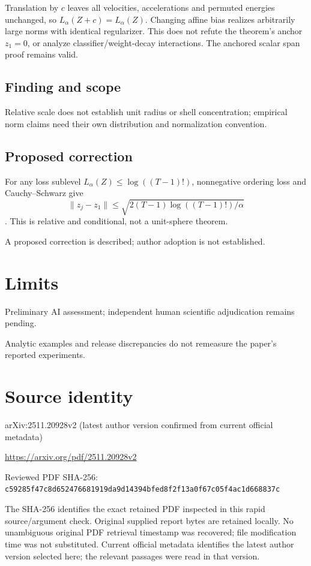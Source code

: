 \documentclass[11pt]{article}
\begin{document}
Translation by \(c\) leaves all velocities, accelerations and permuted energies unchanged, so \(L_\alpha(Z+c)=L_\alpha(Z)\). Changing affine bias realizes arbitrarily large norms with identical regularizer. This does not refute the theorem’s anchor \(z_1=0\), or analyze classifier/weight-decay interactions. The anchored scalar span proof remains valid.

\subsection*{Finding and scope}

Relative scale does not establish unit radius or shell concentration; empirical norm claims need their own distribution and normalization convention.

\subsection*{Proposed correction}

For any loss sublevel \(L_\alpha(Z)\le\log((T-1)!)\), nonnegative ordering loss and Cauchy–Schwarz give \[\|z_j-z_1\|\le\sqrt{2(T-1)\log((T-1)!)/\alpha}\]. This is relative and conditional, not a unit-sphere theorem.

A proposed correction is described; author adoption is not established.

\section*{Limits}

Preliminary AI assessment; independent human scientific adjudication remains pending.\par

Analytic examples and release discrepancies do not remeasure the paper’s reported experiments.\par

\section*{Source identity}

arXiv:2511.20928v2 (latest author version confirmed from current official metadata)

\url{https://arxiv.org/pdf/2511.20928v2}

Reviewed PDF SHA-256: \nolinkurl{c59285f47c8d652476681919da9d14394bfed8f2f13a0f67c05f4ac1d668837c}

The SHA-256 identifies the exact retained PDF inspected in this rapid source/argument check. Original supplied report bytes are retained locally. No unambiguous original PDF retrieval timestamp was recovered; file modification time was not substituted. Current official metadata identifies the latest author version selected here; the relevant passages were read in that version.
\end{document}
